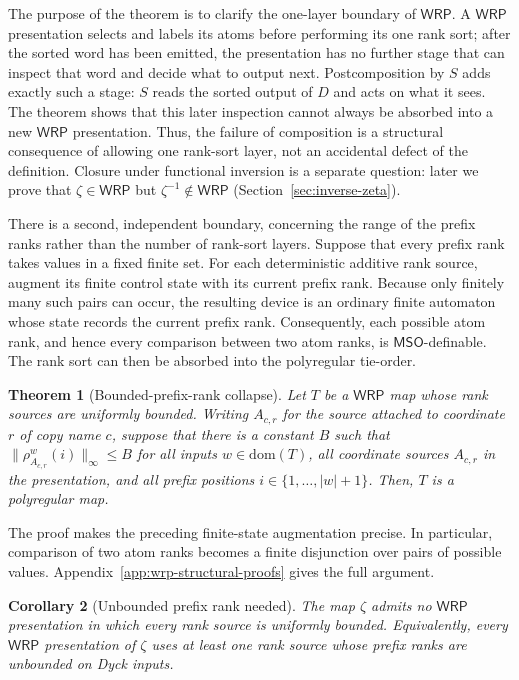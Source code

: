 \documentclass[11pt]{article}
\newtheorem{theorem}{Theorem}[section]
\newtheorem{corollary}[theorem]{Corollary}
\theoremstyle{definition}
\newcommand{\WRP}{\mathsf{WRP}}
\newcommand{\MSO}{\mathsf{MSO}}
\begin{document}
The purpose of the theorem is to clarify the one-layer boundary of $\WRP$.
A $\WRP$ presentation selects and labels its atoms before performing its one
rank sort; after the sorted word has been emitted, the presentation has no
further stage that can inspect that word and decide what to output next.
Postcomposition by $S$ adds exactly such a stage: $S$ reads the sorted output
of $D$ and acts on what it sees.  The theorem shows that this later inspection
cannot always be absorbed into a new $\WRP$ presentation.  Thus, the failure of
composition is a structural consequence of allowing one rank-sort layer, not
an accidental defect of the definition.  Closure under functional inversion
is a separate question: later we prove that $\zeta\in\WRP$ but
$\zeta^{-1}\notin\WRP$ (Section~\ref{sec:inverse-zeta}).

There is a second, independent boundary, concerning the range of the prefix ranks
rather than the number of rank-sort layers.  Suppose that every prefix rank
takes values in a fixed finite set.  For each deterministic additive rank
source, augment its finite control state with its current prefix rank.
Because only finitely many such pairs can occur, the resulting device is an
ordinary finite automaton whose state records the current prefix rank.
Consequently, each possible atom rank, and hence every comparison between two
atom ranks, is
$\MSO$-definable.  The rank sort can then be absorbed into the polyregular
tie-order.

\begin{theorem}[Bounded-prefix-rank collapse]
\label{thm:bounded-rank-collapse}
Let $T$ be a $\WRP$ map whose rank sources are uniformly
\emph{bounded}.  Writing $A_{c,r}$ for the source attached to coordinate $r$
of copy name $c$, suppose that there is a constant $B$ such that
$\lVert\rho_{A_{c,r}}^w(i)\rVert_\infty\le B$ for all inputs
$w\in\mathrm{dom}(T)$, all coordinate sources $A_{c,r}$ in the presentation,
and all prefix positions
$i\in\{1,\ldots,|w|+1\}$.  Then, $T$ is a
polyregular map.
\end{theorem}

The proof makes the preceding finite-state augmentation precise.  In
particular, comparison of two atom ranks becomes a finite disjunction over
pairs of possible values.  Appendix~\ref{app:wrp-structural-proofs} gives the full
argument.

\begin{corollary}[Unbounded prefix rank needed]\label{cor:rank-necessary}
The map $\zeta$ admits no $\WRP$ presentation in which every rank source is
uniformly bounded.  Equivalently, every $\WRP$ presentation of $\zeta$ uses at
least one rank source whose prefix ranks are unbounded on Dyck inputs.
\end{corollary}
\end{document}

